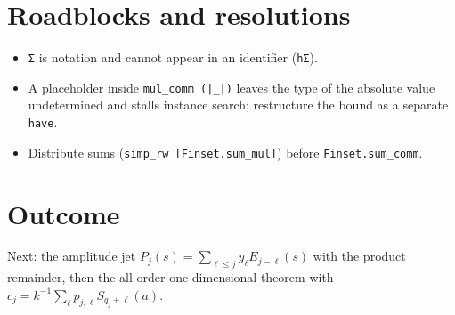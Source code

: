 \documentclass[11pt]{article}
\begin{document}
\section{Roadblocks and resolutions}
\begin{itemize}
\item \texttt{Σ} is notation and cannot appear in an identifier (\texttt{hΣ}).
\item A placeholder inside \texttt{mul\_comm (|\_|)} leaves the type of the absolute value
undetermined and stalls instance search; restructure the bound as a separate \texttt{have}.
\item Distribute sums (\texttt{simp\_rw [Finset.sum\_mul]}) before \texttt{Finset.sum\_comm}.
\end{itemize}

\section{Outcome}
Next: the amplitude jet $P_j(s)=\sum_{\ell\le j}y_\ell E_{j-\ell}(s)$ with the product remainder, then
the all-order one-dimensional theorem with $c_j=k^{-1}\sum_\ell p_{j,\ell}S_{q_j+\ell}(a)$.
\end{document}
